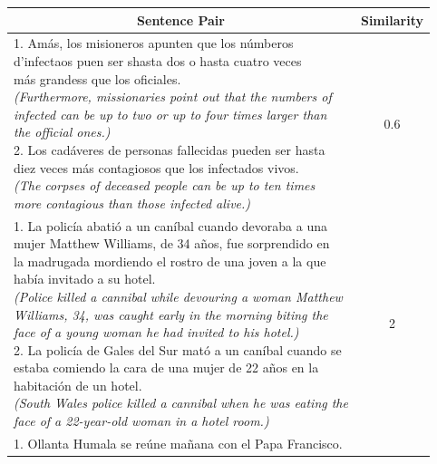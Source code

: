 \begin{enumerate}
\begin{table}[ht!]
	\centering
	\begin{tabular}{l|c}
		\hline
		\multicolumn{1}{c|}{\textbf{Sentence Pair}} & 
		\multicolumn{1}{c}{\textbf{Similarity}}  \\
		\hline
		\makecell[l]{1. Amás, los misioneros apunten que los númberos \\ d'infectaos puen ser shasta dos o hasta cuatro veces \\ más grandess que los oficiales. \\
			\textit{(Furthermore, missionaries point out that the numbers of } \\ \textit{infected can be up to two or up to four times larger than} \\ \textit{the official ones.)} \\ 
			2. Los cadáveres de personas fallecidas pueden ser hasta \\ diez veces más contagiosos que los infectados vivos. \\ 
			\textit{(The corpses of deceased people can be up to ten times } \\ \textit{more contagious than those infected alive.)}} & 0.6  \\
		\hline
		\makecell[l]{1. La policía abatió a un caníbal cuando devoraba a una  \\ mujer Matthew Williams, de 34 años, fue sorprendido en \\ la madrugada mordiendo el rostro de una joven a la que  \\ había invitado a su hotel. \\ 
			\textit{(Police killed a cannibal while devouring a woman Matthew } \\ \textit{Williams, 34, was caught early in the morning biting the} \\ \textit{ face of a young woman he had invited to his hotel.)} \\
			2. La policía de Gales del Sur mató a un caníbal cuando se \\ estaba comiendo la cara de una mujer de 22 años en la \\ habitación de un hotel. \\ 
			\textit{(South Wales police killed a cannibal when he was eating the } \\ \textit{face of a 22-year-old woman in a hotel room.)} } & 2  \\
		\hline
		\makecell[l]{1. Ollanta Humala se reúne mañana con el Papa Francisco. \\
}
\end{tabular}
\end{table}
\end{enumerate}
